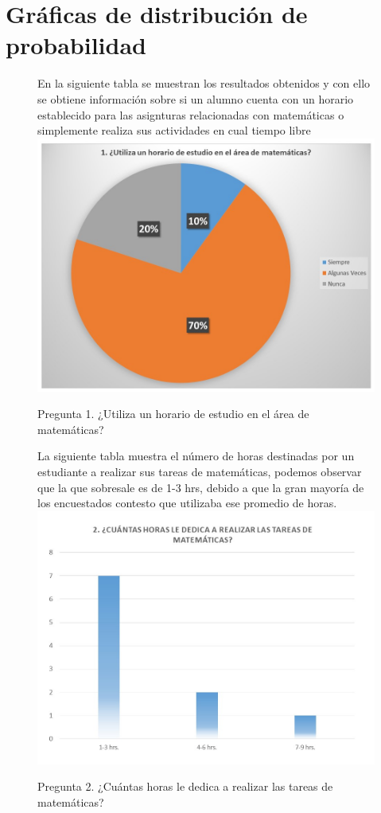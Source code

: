 \documentclass[12pt] {report}
\begin{document}
\section{Gráficas de distribución de probabilidad }
\begin{figure}[H]
\centering
En la siguiente tabla se muestran los resultados obtenidos y con ello se obtiene información sobre si un alumno cuenta con un horario establecido para las asignturas relacionadas con matemáticas o simplemente realiza sus actividades en cual tiempo libre 
\includegraphics[scale=.5]{pregunta1.JPG}
\caption{Pregunta 1. ¿Utiliza un horario de estudio en el área de matemáticas?}
\end{figure}
\begin{figure}[H]
\centering
La siguiente tabla muestra el número de horas destinadas por un estudiante a realizar sus tareas de matemáticas, podemos observar que la que sobresale es de 1-3 hrs, debido a que la gran mayoría de los encuestados contesto que utilizaba ese promedio de horas.
\includegraphics[scale=.4]{pregunta2.JPG}
\caption{Pregunta 2. ¿Cuántas horas le dedica a realizar las tareas de matemáticas?}
\end{figure}
\end{document}
